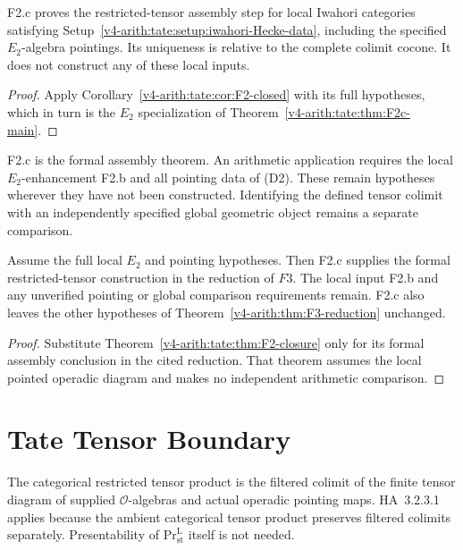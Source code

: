 \begin{theorem}
\label{v4-arith:tate:thm:F2-closure}
F2.c proves the restricted-tensor assembly step for local
Iwahori categories satisfying
Setup~\ref{v4-arith:tate:setup:iwahori-Hecke-data}, including
the specified \(E_2\)-algebra pointings. Its uniqueness is
relative to the complete colimit cocone. It does not construct
any of these local inputs.
\end{theorem}

\begin{proof}
Apply Corollary~\ref{v4-arith:tate:cor:F2-closed} with its full
hypotheses, which in turn is the \(E_2\) specialization of
Theorem~\ref{v4-arith:tate:thm:F2c-main}.
\end{proof}

\begin{remark}
\label{v4-arith:tate:rem:F2-form-final}
F2.c is the formal assembly theorem. An arithmetic application
requires the local \(E_2\)-enhancement F2.b and all pointing data
of (D2). These remain hypotheses wherever they have not been constructed.
Identifying the defined tensor colimit with an independently
specified global geometric object remains a separate comparison.
\end{remark}

\begin{corollary}
\label{v4-arith:tate:cor:F3-reduces-with-F2-closed}
Assume the full local \(E_2\) and pointing hypotheses.
Then F2.c supplies the formal restricted-tensor construction
in the reduction of \(F3\). The
local input F2.b and any unverified pointing or global comparison
requirements remain. F2.c also leaves the other hypotheses of
Theorem~\ref{v4-arith:thm:F3-reduction} unchanged.
\end{corollary}

\begin{proof}
Substitute Theorem~\ref{v4-arith:tate:thm:F2-closure} only for
its formal assembly conclusion in the cited reduction.
That theorem assumes the local pointed operadic diagram and
makes no independent arithmetic comparison.
\end{proof}

\section{Tate Tensor Boundary}
\label{v4-arith:tate:summary}

The categorical restricted tensor product is the filtered
colimit of the finite tensor diagram of supplied
\(\mathcal O\)-algebras and actual operadic pointing maps.
HA~3.2.3.1 applies because the ambient categorical tensor product
preserves filtered colimits separately. Presentability of
\(\mathrm{Pr}^{\mathrm L}_{\mathrm{st}}\) itself is not needed.

